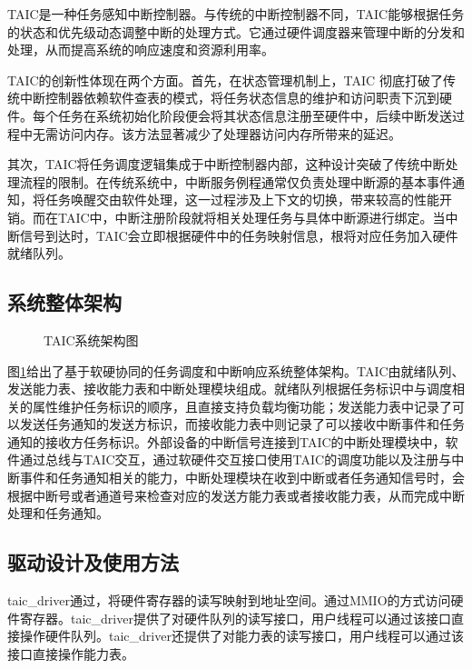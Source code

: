 TAIC是一种任务感知中断控制器。与传统的中断控制器不同，TAIC能够根据任务的状态和优先级动态调整中断的处理方式。它通过硬件调度器来管理中断的分发和处理，从而提高系统的响应速度和资源利用率。

TAIC的创新性体现在两个方面。首先，在状态管理机制上，TAIC 彻底打破了传统中断控制器依赖软件查表的模式，将任务状态信息的维护和访问职责下沉到硬件。每个任务在系统初始化阶段便会将其状态信息注册至硬件中，后续中断发送过程中无需访问内存。该方法显著减少了处理器访问内存所带来的延迟。

其次，TAIC将任务调度逻辑集成于中断控制器内部，这种设计突破了传统中断处理流程的限制。在传统系统中，中断服务例程通常仅负责处理中断源的基本事件通知，将任务唤醒交由软件处理，这一过程涉及上下文的切换，带来较高的性能开销。而在TAIC中，中断注册阶段就将相关处理任务与具体中断源进行绑定。当中断信号到达时，TAIC会立即根据硬件中的任务映射信息，根将对应任务加入硬件就绪队列。

\subsection{系统整体架构}

\begin{figure}[htbp]
    \centering
    
    \caption{TAIC系统架构图}\label{taicarch}
\end{figure}

图\ref{taicarch}给出了基于软硬协同的任务调度和中断响应系统整体架构\cite{taic2024}。TAIC由就绪队列、发送能力表、接收能力表和中断处理模块组成。就绪队列根据任务标识中与调度相关的属性维护任务标识的顺序，且直接支持负载均衡功能；发送能力表中记录了可以发送任务通知的发送方标识，而接收能力表中则记录了可以接收中断事件和任务通知的接收方任务标识。外部设备的中断信号连接到TAIC的中断处理模块中，软件通过总线与TAIC交互，通过软硬件交互接口使用TAIC的调度功能以及注册与中断事件和任务通知相关的能力，中断处理模块在收到中断或者任务通知信号时，会根据中断号或者通道号来检查对应的发送方能力表或者接收能力表，从而完成中断处理和任务通知。\cite{taic2024}

\subsection{驱动设计及使用方法}\label{sec:taicdriver}

taic\_driver通过，将硬件寄存器的读写映射到地址空间。通过MMIO的方式访问硬件寄存器。taic\_driver提供了对硬件队列的读写接口，用户线程可以通过该接口直接操作硬件队列。taic\_driver还提供了对能力表的读写接口，用户线程可以通过该接口直接操作能力表。

